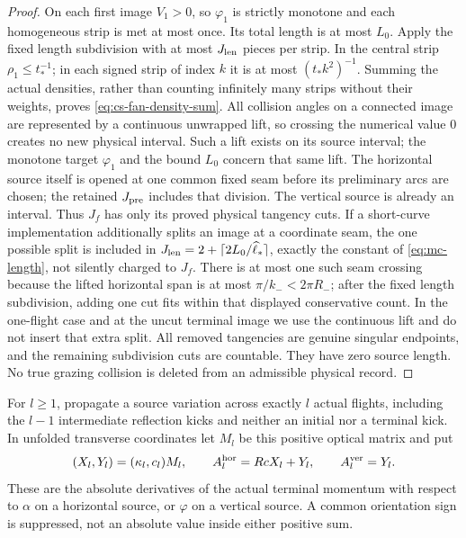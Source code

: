 \begin{proof}
On each first image $V_1>0$, so $\varphi_1$ is strictly monotone and
each homogeneous strip is met at most once.  Its total length is at
most $L_0$.  Apply the fixed length subdivision with at most
$J_{\rm len}$ pieces per strip.  In the central strip
$\rho_1\le t_*^{-1}$; in each signed strip of index $k$ it is at
most $(t_*k^2)^{-1}$.  Summing the actual densities, rather than
counting infinitely many strips without their weights, proves
\eqref{eq:cs-fan-density-sum}.  All collision angles on a connected image are represented by a
continuous unwrapped lift, so crossing the numerical value $0$ creates
no new physical interval.  Such a lift exists on its source interval;
the monotone target $\varphi_1$ and the bound $L_0$ concern that
same lift.  The horizontal source itself is opened at one common fixed
seam before its preliminary arcs are chosen; the retained $J_{\rm pre}$
includes that division.  The vertical source is already an interval.
Thus $J_f$ has only its proved physical tangency cuts.  If a short-curve
implementation additionally splits an image at a coordinate seam,
the one possible split is included in
$J_{\rm len}=2+\lceil2L_0/\widehat\ell_*\rceil$, exactly the
constant of \eqref{eq:mc-length}, not silently charged to $J_f$.
There is at most one such seam crossing because the lifted
horizontal span is at most $\pi/k_-<2\pi R_-$; after the fixed
length subdivision, adding one cut fits within that displayed
conservative count.  In the one-flight case and at the
uncut terminal image we use the continuous lift and do not insert
that extra split.  All removed tangencies
are genuine singular endpoints, and the remaining subdivision cuts
are countable.  They have zero source length.  No true grazing
collision is deleted from an admissible physical record.
\end{proof}

For $l\ge1$, propagate a source variation across exactly $l$ actual
flights, including the $l-1$ intermediate reflection kicks and neither
an initial nor a terminal kick.  In unfolded transverse coordinates
let $M_l$ be this positive optical matrix and put
\begin{equation}\label{eq:cs-rows}
 (X_l,Y_l)=(\kappa_l,c_l)M_l,\qquad
 A_l^{\rm hor}=RcX_l+Y_l,\qquad A_l^{\rm ver}=Y_l.
\end{equation}
These are the absolute derivatives of the actual terminal momentum
with respect to $\alpha$ on a horizontal source, or $\varphi$ on
a vertical source.  A common orientation sign is suppressed, not an
absolute value inside either positive sum.

